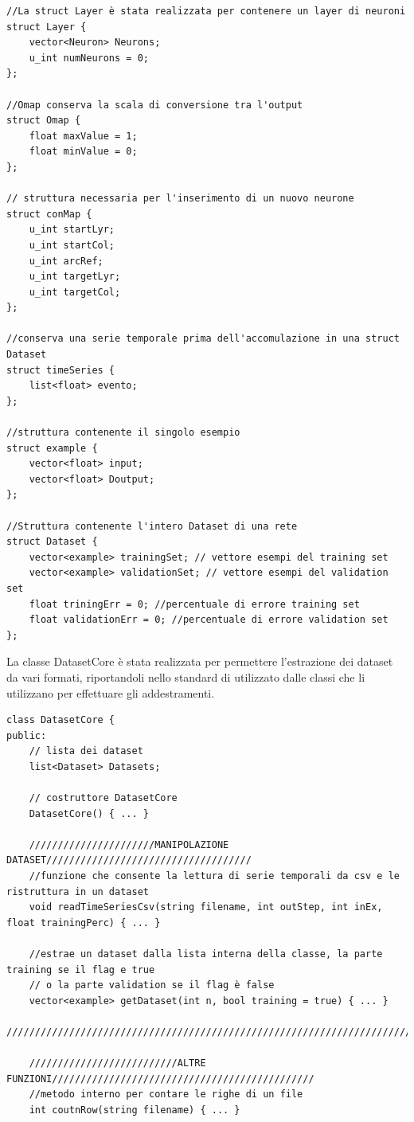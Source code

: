 \documentclass[10pt,a4paper]{article}
\begin{document}
\begin{lstlisting}[style=mycuda, caption=struct strutturali del modello, captionpos=b]
//La struct Layer è stata realizzata per contenere un layer di neuroni
struct Layer {
	vector<Neuron> Neurons;
	u_int numNeurons = 0;
};

//Omap conserva la scala di conversione tra l'output
struct Omap {
	float maxValue = 1;
	float minValue = 0;
};

// struttura necessaria per l'inserimento di un nuovo neurone
struct conMap { 
	u_int startLyr;
	u_int startCol;
	u_int arcRef;
	u_int targetLyr;
	u_int targetCol;
};

//conserva una serie temporale prima dell'accomulazione in una struct Dataset 
struct timeSeries {
	list<float> evento;
};

//struttura contenente il singolo esempio
struct example {
	vector<float> input;
	vector<float> Doutput;
};

//Struttura contenente l'intero Dataset di una rete
struct Dataset {
	vector<example> trainingSet; // vettore esempi del training set
	vector<example> validationSet; // vettore esempi del validation set
	float triningErr = 0; //percentuale di errore training set
	float validationErr = 0; //percentuale di errore validation set
};

\end{lstlisting}

La classe DatasetCore è stata realizzata per permettere l'estrazione dei dataset da vari formati, riportandoli nello standard di utilizzato dalle classi che li utilizzano per effettuare gli addestramenti.
\begin{lstlisting}[style=mycuda, caption=class DatasetCore, captionpos=b]
class DatasetCore {
public:
	// lista dei dataset
	list<Dataset> Datasets; 
	
	// costruttore DatasetCore
	DatasetCore() { ... }
	
	//////////////////////MANIPOLAZIONE DATASET////////////////////////////////////
	//funzione che consente la lettura di serie temporali da csv e le ristruttura in un dataset
	void readTimeSeriesCsv(string filename, int outStep, int inEx, float trainingPerc) { ... }
	
	//estrae un dataset dalla lista interna della classe, la parte training se il flag e true
	// o la parte validation se il flag è false
	vector<example> getDataset(int n, bool training = true) { ... }
	//////////////////////////////////////////////////////////////////////////////////////
	
	//////////////////////////ALTRE FUNZIONI//////////////////////////////////////////////
	//metodo interno per contare le righe di un file
	int coutnRow(string filename) { ... }
\end{lstlisting}
\end{document}
